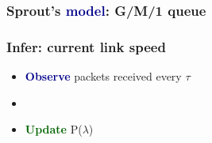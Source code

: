 \documentclass[svgnames]{beamer}
\begin{document}
\begin{frame}

\begin{centering}
\frametitle{Sprout's \textcolor{DarkBlue}{\bf model}: G/M/1 queue}
\def\svgwidth{\columnwidth}

\end{centering}



\end{frame}

\begin{frame}
\frametitle{\textbf{Infer}: current link speed}

\Large

\begin{itemize}

\item \textcolor{DarkBlue}{\bf Observe} packets received every $\tau$

\item[]

\item \textcolor{DarkGreen}{\bf Update} P($\lambda$)

\end{itemize}

\end{frame}
\end{document}
